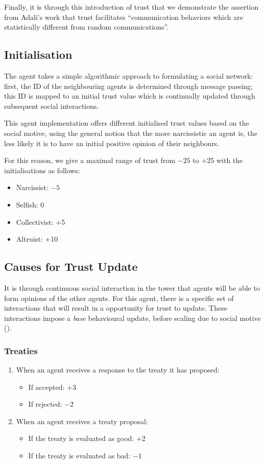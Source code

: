 Finally, it is through this introduction of trust that we demonstrate the assertion from Adali's work \cite{trustEEE} that trust facilitates ``communication behaviors which are statistically different from random communications''.

\subsection{Initialisation}
The agent takes a simple algorithmic approach to formulating a social network: first, the ID of the neighbouring agents is determined through message passing; this ID is mapped to an initial trust value which is continually updated through subsequent social interactions. 

This agent implementation offers different initialised trust values based on the social motive, using the general notion that the more narcissistic an agent is, the less likely it is to have an initial positive opinion of their neighbours. 

For this reason, we give a maximal range of trust from $-25$ to +25 with the initialisations as follows:
\begin{itemize}
    \item Narcissist: $-5$
    \item Selfish: 0
    \item Collectivist: +5
    \item Altruist: +10
\end{itemize}

\subsection{Causes for Trust Update}

It is through continuous social interaction in the tower that agents will be able to form opinions of the other agents. For this agent, there is a specific set of interactions that will result in a opportunity for trust to update. These interactions impose a \textit{base} behavioural update, before scaling due to social motive ().

\subsubsection{Treaties}

\begin{enumerate}
    \item When an agent receives a response to the treaty it has proposed: 
    \begin{itemize}
        \item If accepted: +3
        \item If rejected: $-2$
    \end{itemize}
    \item When an agent receives a treaty proposal: 
    \begin{itemize}
        \item  If the treaty is evaluated as good: +2
        \item   If the treaty is evaluated as bad: $-1$
    \end{itemize}
\end{enumerate}

